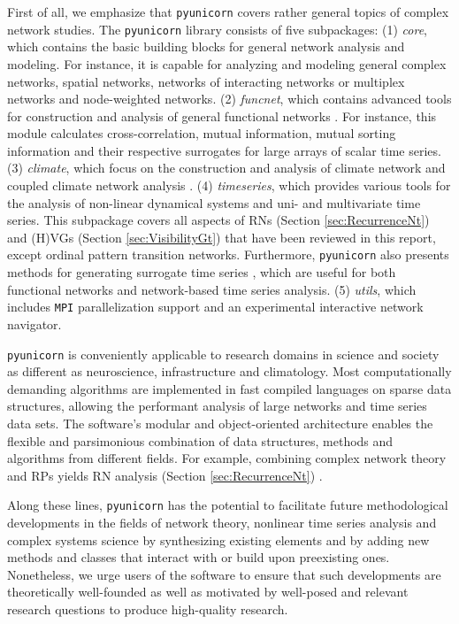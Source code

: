 	First of all, we emphasize that \texttt{pyunicorn} covers rather general topics of complex network studies. The \texttt{pyunicorn} library consists of five subpackages: (1) {\it core}, which contains the basic building blocks for general network analysis and modeling. For instance, it is capable for analyzing and modeling general complex networks, spatial networks, networks of interacting networks or multiplex networks and node-weighted networks. (2) {\it funcnet}, which contains advanced tools for construction and analysis of general functional networks \cite{Bullmore2009,Donges2012PhD}. For instance, this module calculates cross-correlation, mutual information, mutual sorting information and their respective surrogates for large arrays of scalar time series. (3) {\it climate}, which focus on the construction and analysis of climate network \cite{Tsonis2004,Yamasaki2008,Donges2009,Donges2009b} and coupled climate network analysis \cite{Donges2011b}. (4) {\it timeseries}, which provides various tools for the analysis of non-linear dynamical systems and uni- and multivariate time series. This subpackage covers all aspects of RNs (Section \ref{sec:RecurrenceNt}) and (H)VGs (Section \ref{sec:VisibilityGt}) that have been reviewed in this report, except ordinal pattern transition networks. Furthermore, \texttt{pyunicorn} also presents methods for generating surrogate time series \cite{Schreiber2000}, which are useful for both functional networks and network-based time series analysis. (5) {\it utils}, which includes \texttt{MPI} parallelization support and an experimental interactive network navigator.

	\texttt{pyunicorn} is conveniently applicable to research domains in science and society as different as neuroscience, infrastructure and climatology. Most computationally demanding algorithms are implemented in fast compiled languages on sparse data structures, allowing the performant analysis of large networks and time series data sets. The software's modular and object-oriented architecture enables the flexible and parsimonious combination of data structures, methods and algorithms from different fields. For example, combining complex network theory and RPs yields RN analysis (Section \ref{sec:RecurrenceNt}) \cite{Donges2015}.

	Along these lines, \texttt{pyunicorn} has the potential to facilitate future methodological developments in the fields of network theory, nonlinear time series analysis and complex systems science by synthesizing existing elements and by adding new methods and classes that interact with or build upon preexisting ones. Nonetheless, we urge users of the software to ensure that such developments are theoretically well-founded as well as motivated by well-posed and relevant research questions to produce high-quality research.

